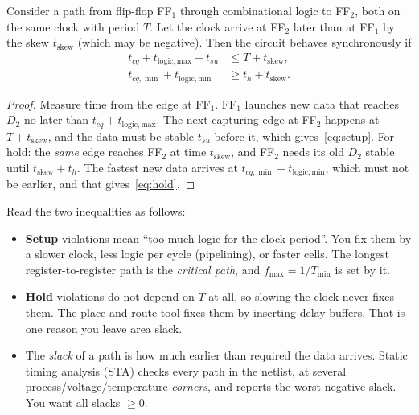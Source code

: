 \begin{theorem}\label{thm:timing}
Consider a path from flip-flop FF$_1$ through combinational logic to FF$_2$,
both on the same clock with period $T$. Let the clock arrive at FF$_2$ later
than at FF$_1$ by the skew $t_{\mathrm{skew}}$ (which may be negative). Then
the circuit behaves synchronously if
\begin{align}
  t_{cq} + t_{\mathrm{logic,max}} + t_{su} &\le T + t_{\mathrm{skew}},
    \label{eq:setup}\\
  t_{cq,\min} + t_{\mathrm{logic,min}} &\ge t_h + t_{\mathrm{skew}}.
    \label{eq:hold}
\end{align}
\end{theorem}
\begin{proof}
Measure time from the edge at FF$_1$. FF$_1$ launches new data that reaches
$D_2$ no later than $t_{cq}+t_{\mathrm{logic,max}}$. The next capturing edge
at FF$_2$ happens at $T+t_{\mathrm{skew}}$, and the data must be stable
$t_{su}$ before it, which gives~\eqref{eq:setup}. For hold: the \emph{same}
edge reaches FF$_2$ at time $t_{\mathrm{skew}}$, and FF$_2$ needs its old
$D_2$ stable until $t_{\mathrm{skew}}+t_h$. The fastest new data arrives at
$t_{cq,\min}+t_{\mathrm{logic,min}}$, which must not be earlier, and that
gives~\eqref{eq:hold}.
\end{proof}

Read the two inequalities as follows:
\begin{itemize}
  \item \textbf{Setup} violations mean ``too much logic for the clock
    period''. You fix them by a slower clock, less logic per cycle
    (pipelining), or faster cells. The longest register-to-register path is
    the \emph{critical path}, and $f_{\max} = 1/T_{\min}$ is set by it.
  \item \textbf{Hold} violations do not depend on $T$ at all, so slowing the
    clock never fixes them. The place-and-route tool fixes them by inserting
    delay buffers. That is one reason you leave area slack.
  \item The \emph{slack} of a path is how much earlier than required the
    data arrives. Static timing analysis (STA) checks every path in the
    netlist, at several process/voltage/temperature \emph{corners}, and
    reports the worst negative slack. You want all slacks $\ge 0$.
\end{itemize}

